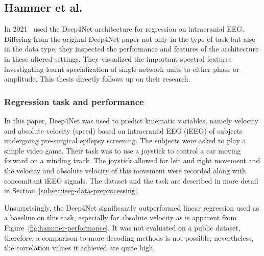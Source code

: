 \subsection{Hammer et al.}\label{subsec:hammer-et-al}
In 2021~\cite{Hammer-2021} used the Deep4Net architecture for regression on intracranial EEG.
Differing from the original Deep4Net paper not only in the type of task but also in the data type, they inspected the performance and features of the architecture in these altered settings.
They visualized the important spectral features investigating learnt specialization of single network units to either phase or amplitude.
This thesis directly follows up on their research.

\subsubsection{Regression task and performance}
In this paper, Deep4Net was used to predict kinematic variables, namely velocity and absolute velocity (speed) based on intracranial EEG (iEEG) of subjects undergoing pre-surgical epilepsy screening.
The subjects were asked to play a simple video game.
Their task was to use a joystick to control a car moving forward on a winding track.
The joystick allowed for left and right movement and the velocity and absolute velocity of this movement were recorded along with concomitant iEEG signals. 
The dataset and the task are described in more detail in Section~\ref{subsec:ieeg-data-preprocessing}.

Unsurprisingly, the Deep4Net significantly outperformed linear regression used as a baseline on this task, especially for absolute velocity as is apparent from Figure~\ref{fig:hammer-performance}.
It was not evaluated on a public dataset, therefore, a comparison to more decoding methods is not possible, nevertheless, the correlation values it achieved are quite high.

